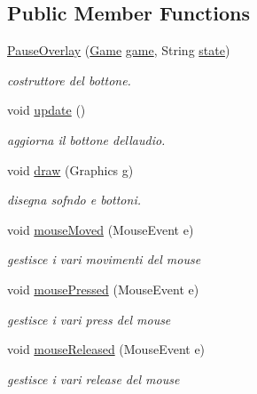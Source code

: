 \subsection*{Public Member Functions}
\begin{DoxyCompactItemize}
\item 
\hyperlink{classui_1_1_pause_overlay_a0e32a19d0569e8e64462db08f47ec52f}{Pause\+Overlay} (\hyperlink{classprogetto_1_1_game}{Game} \hyperlink{classui_1_1_pause_overlay_ac6a5ed6191fcf3a5bf0445921feb4f48}{game}, String \hyperlink{classui_1_1_pause_overlay_a91ac952876f776b3fbbc8519e093fdbf}{state})
\begin{DoxyCompactList}\small\item\em costruttore del bottone. \end{DoxyCompactList}\item 
void \hyperlink{classui_1_1_pause_overlay_ac5c54df7ed3b930268c8d7752c101725}{update} ()
\begin{DoxyCompactList}\small\item\em aggiorna il bottone dell\textquotesingle{}audio. \end{DoxyCompactList}\item 
void \hyperlink{classui_1_1_pause_overlay_a72fe1ffca978e99fd16994a10e7f8051}{draw} (Graphics g)
\begin{DoxyCompactList}\small\item\em disegna sofndo e bottoni. \end{DoxyCompactList}\item 
void \hyperlink{classui_1_1_pause_overlay_a2ca251710b65639ec80bc141edde60aa}{mouse\+Moved} (Mouse\+Event e)
\begin{DoxyCompactList}\small\item\em gestisce i vari movimenti del mouse \end{DoxyCompactList}\item 
void \hyperlink{classui_1_1_pause_overlay_aed82e1ce3dd3cf283d508c3ba3be70ef}{mouse\+Pressed} (Mouse\+Event e)
\begin{DoxyCompactList}\small\item\em gestisce i vari press del mouse \end{DoxyCompactList}\item 
void \hyperlink{classui_1_1_pause_overlay_a87a07291794e15052db67f945d90853e}{mouse\+Released} (Mouse\+Event e)
\begin{DoxyCompactList}\small\item\em gestisce i vari release del mouse \end{DoxyCompactList}\item 

\end{DoxyCompactItemize}
